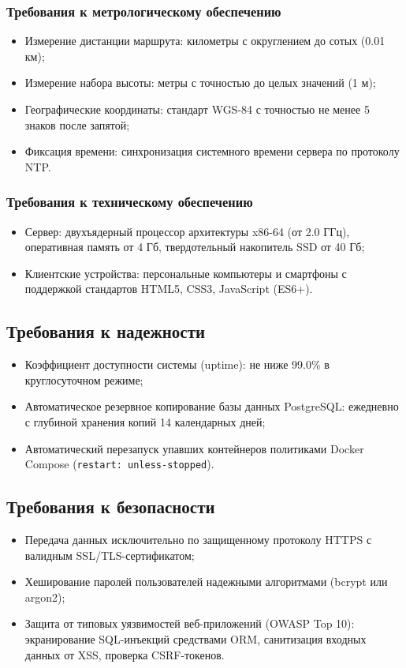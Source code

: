 \documentclass[a4paper,12pt]{article}
\begin{document}
\subsubsection{Требования к метрологическому обеспечению}
\begin{itemize}
	\item Измерение дистанции маршрута: километры с округлением до сотых (0.01 км);
	\item Измерение набора высоты: метры с точностью до целых значений (1 м);
	\item Географические координаты: стандарт WGS-84 с точностью не менее 5 знаков после запятой;
	\item Фиксация времени: синхронизация системного времени сервера по протоколу NTP.
\end{itemize}

\subsubsection{Требования к техническому обеспечению}
\begin{itemize}
	\item Сервер: двухъядерный процессор архитектуры x86-64 (от 2.0 ГГц), оперативная память от 4 Гб, твердотельный накопитель SSD от 40 Гб;
	\item Клиентские устройства: персональные компьютеры и смартфоны с поддержкой стандартов HTML5, CSS3, JavaScript (ES6+).
\end{itemize}

\subsection{Требования к надежности}
\begin{itemize}
	\item Коэффициент доступности системы (uptime): не ниже 99.0\% в круглосуточном режиме;
	\item Автоматическое резервное копирование базы данных PostgreSQL: ежедневно с глубиной хранения копий 14 календарных дней;
	\item Автоматический перезапуск упавших контейнеров политиками Docker Compose (\texttt{restart: unless-stopped}).
\end{itemize}

\subsection{Требования к безопасности}
\begin{itemize}
	\item Передача данных исключительно по защищенному протоколу HTTPS с валидным SSL/TLS-сертификатом;
	\item Хеширование паролей пользователей надежными алгоритмами (bcrypt или argon2);
	\item Защита от типовых уязвимостей веб-приложений (OWASP Top 10): экранирование SQL-инъекций средствами ORM, санитизация входных данных от XSS, проверка CSRF-токенов.
\end{itemize}
\end{document}
